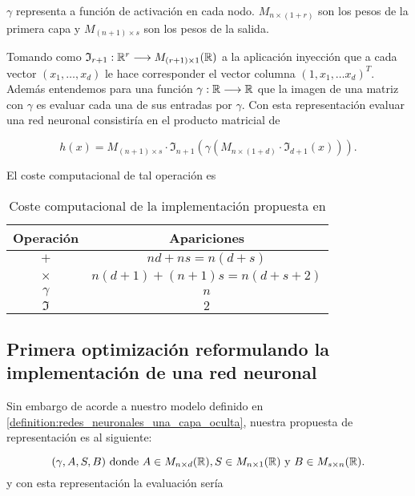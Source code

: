 $\gamma$ representa a función de activación en cada nodo. 
$M_{n \times (1+r)}$ son los pesos de la primera capa 
y $M_{(n+1) \times s}$ son los pesos de la salida. 

Tomando como $\mathfrak{I}_{r+1}: \mathbb{R}^r \longrightarrow M_{(r+1) \times 1}(\mathbb{R})$ a la aplicación inyección que a cada vector $(x_1, \ldots, x_d)$ le hace corresponder el vector columna $(1, x_1, \ldots x_d)^T.$
Además entendemos para una función $\gamma : \mathbb{R} \longrightarrow \mathbb{R}$ 
que la imagen de una matriz con $\gamma$ es evaluar cada una de sus entradas por $\gamma$. 
Con esta representación evaluar una red neuronal consistiría en el producto matricial de 

\begin{equation}
    h(x) =  M_{(n+1) \times s} \cdot
    \mathfrak{I}_{n+1}\left(
         \gamma \left( 
             M_{n \times (1+d)} 
            \cdot 
            \mathfrak{I}_{d+1}(x)
        \right)
    \right).
\end{equation}

El coste computacional de tal operación es 
\begin{table}[h]
    \begin{center}
    \begin{tabular}{| c | c |}
    \hline
    Operación & Apariciones  \\ \hline
    $+$ & $n d+n s = n(d+s)$  \\
    $\times$ & $n(d+1)+(n+1)s = n(d+s+2)$  \\
    $\gamma$ & $n$  \\
    $\mathfrak{I}$ & $2$  \\
    \hline
    \end{tabular}
    \caption{Coste computacional de la implementación propuesta en \cite{MostafaLearningFromData}}
    \label{tab:coste computacional de la implementación de Mustafa}
    \end{center}
\end{table}

\subsection*{Primera optimización reformulando la implementación de una red neuronal}

Sin embargo de acorde a nuestro modelo definido en \ref{definition:redes_neuronales_una_capa_oculta}, nuestra propuesta de representación es al siguiente: 

\begin{equation}
    (\gamma, A, S, B) 
    \text{ donde } 
    A \in M_{n \times d}(\mathbb{R}), 
    S\in M_{n \times 1}(\mathbb{R}) 
    \text{ y }
    B \in M_{s \times n}(\mathbb{R}).
\end{equation}
y con esta representación la evaluación sería

